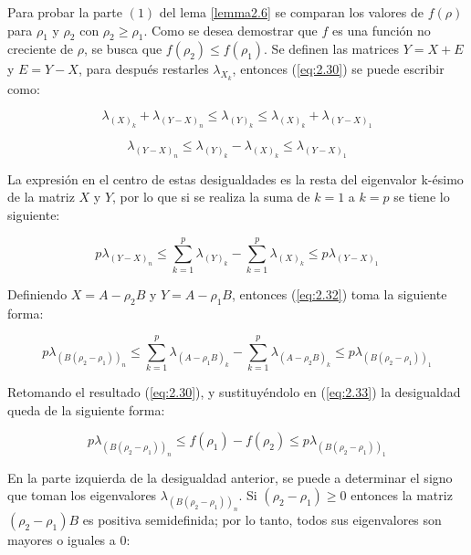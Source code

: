 Para probar la parte $(1)$ del lema \ref{lemma2.6} se comparan los valores de $f(\rho)$ para $\rho_1$ y $\rho_2$ con $\rho_2 \geq \rho_1$. Como se desea demostrar que $f$ es una función no creciente de $\rho$, se busca que $f(\rho_2) \leq f(\rho_1)$. Se definen las matrices $Y=X+E$ y $E = Y-X$, para después restarles $\lambda_{X_k}$, entonces (\ref{eq:2.30}) se puede escribir como:

\begin{equation*}
		\lambda_{(X)_k} +\lambda_{(Y-X)_n} \leq \lambda_{(Y)_k} \leq \lambda_{(X)_k} +\lambda_{(Y-X)_1}
\end{equation*}

\begin{equation*}
		\lambda_{(Y-X)_n} \leq \lambda_{(Y)_k} - \lambda_{(X)_k} \leq \lambda_{(Y-X)_1}
\end{equation*}

La expresión en el centro de estas desigualdades es la resta del eigenvalor k-ésimo de la matriz $X$ y $Y$, por lo que si se realiza la suma de $k = 1$ a $k = p$ se tiene lo siguiente:

\begin{equation}\label{eq:2.32}
		p \lambda_{(Y-X)_n} \leq \sum_{k=1}^{p} \lambda_{(Y)_k} - \sum_{k=1}^{p} \lambda_{(X)_k} \leq  p \lambda_{(Y-X)_1}
\end{equation}

Definiendo $X = A - \rho_2 B$ y $Y = A - \rho_1 B$, entonces (\ref{eq:2.32}) toma la siguiente forma:

\begin{equation}\label{eq:2.33}
    p \lambda_{(B(\rho_2-\rho_1))_n} \leq \sum_{k=1}^{p} \lambda_{(A - \rho_1 B)_k} - \sum_{k=1}^{p} \lambda_{(A - \rho_2 B)_k} \leq  p \lambda_{(B(\rho_2-\rho_1))_1}
\end{equation}

Retomando el resultado (\ref{eq:2.30}), y sustituyéndolo en (\ref{eq:2.33}) la desigualdad queda de la siguiente forma:

\begin{equation}\label{eq:2.34}
		p \lambda_{(B (\rho_2 - \rho_1))_n} \leq f(\rho_1) - f(\rho_2) \leq  p \lambda_{(B (\rho_2 - \rho_1))_1}
\end{equation}


En la parte izquierda de la desigualdad anterior, se puede a determinar el signo que toman los eigenvalores $\lambda_{(B (\rho_2 - \rho_1))_n}$. 
Si $(\rho_2- \rho_1) \geq 0$ entonces la matriz $(\rho_2 - \rho_1)B$ es positiva semidefinida; por lo tanto, todos sus eigenvalores son mayores o iguales a 0:

